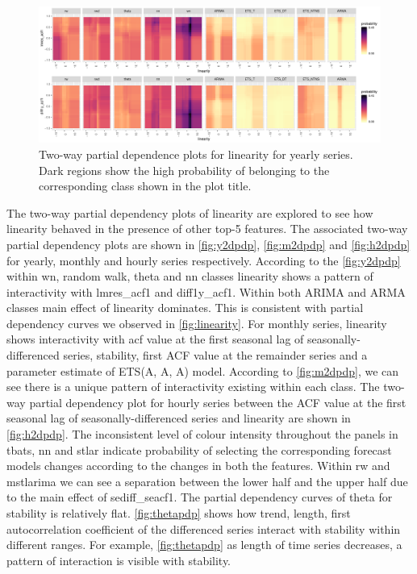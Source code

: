 \documentclass[11pt,a4paper,]{article}
\begin{document}
\begin{figure}[h]

{\centering \includegraphics[width=\textwidth]{figure/y2dpdp-1} 

}

\caption{Two-way partial dependence plots for linearity for yearly series. Dark regions show the high probability of belonging to the corresponding class shown in the plot title.}\label{fig:y2dpdp}
\end{figure}

The two-way partial dependency plots of linearity are explored to see how linearity behaved in the presence of other top-5 features. The associated two-way partial dependency plots are shown in \autoref{fig:y2dpdp}, \autoref{fig:m2dpdp} and \autoref{fig:h2dpdp} for yearly, monthly and hourly series respectively. According to the \autoref{fig:y2dpdp} within wn, random walk, theta and nn classes linearity shows a pattern of interactivity with lmres\_acf1 and diff1y\_acf1. Within both ARIMA and ARMA classes main effect of linearity dominates. This is consistent with partial dependency curves we observed in \autoref{fig:linearity}. For monthly series, linearity shows interactivity with acf value at the first seasonal lag of seasonally-differenced series, stability, first ACF value at the remainder series and a parameter estimate of ETS(A, A, A) model. According to \autoref{fig:m2dpdp}, we can see there is a unique pattern of interactivity existing within each class. The two-way partial dependency plot for hourly series between the ACF value at the first seasonal lag of seasonally-differenced series and linearity are shown in \autoref{fig:h2dpdp}. The inconsistent level of colour intensity throughout the panels in tbats, nn and stlar indicate probability of selecting the corresponding forecast models changes according to the changes in both the features. Within rw and mstlarima we can see a separation between the lower half and the upper half due to the main effect of sediff\_seacf1. The partial dependency curves of theta for stability is relatively flat. \autoref{fig:thetapdp} shows how trend, length, first autocorrelation coefficient of the differenced series interact with stability within different ranges. For example, \autoref{fig:thetapdp} as length of time series decreases, a pattern of interaction is visible with stability.
\end{document}
